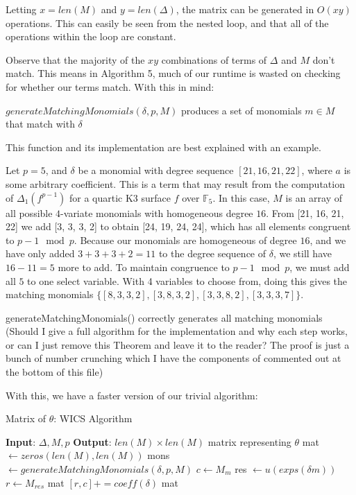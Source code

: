 Letting $x = len(M)$ and $y = len(\Delta)$, the matrix can be generated in $O(xy)$ operations. This can easily be
seen from the nested loop, and that all of the operations within the loop are constant.

Observe that the majority of the $xy$ combinations of terms of $\Delta$ and $M$ don't match. This means in
Algorithm 5, much of our runtime is wasted on checking for whether our terms match. With this in mind:

\begin{defn}
    $generateMatchingMonomials(\delta, p, M)$ produces a set of monomials $m \in M$ that match with $\delta$
\end{defn}

This function and its implementation are best explained with an example.

\begin{ex}
    Let $p = 5$, and $\delta$ be a monomial with degree sequence $[21, 16, 21, 22]$, where $a$ is some arbitrary coefficient. This is a term that may
    result from the computation of $\Delta_1(f^{p - 1})$ for a quartic K3 surface $f$ over $\mathbb{F}_5$. In this case, $M$ is an array
    of all possible $4$-variate monomials with homogeneous degree $16$. From [21, 16, 21, 22] we add [3, 3, 3, 2] to obtain [24, 19, 24, 24], which
    has all elements congruent to $p-1 \mod p$. Because our monomials are homogeneous of degree $16$, and
    we have only added $3 + 3 + 3 + 2 = 11$ to the degree sequence of $\delta$, we still have $16 - 11 = 5$ more to add.
    To maintain congruence to $p-1 \mod p$, we must add all $5$ to one select variable. With 4 variables to choose from, doing this gives the
    matching monomials $\{[8, 3, 3, 2], [3, 8, 3, 2], [3, 3, 8, 2], [3, 3, 3, 7]\}$.
\end{ex}

\begin{thm}
    generateMatchingMonomials() correctly generates all matching monomials (Should I give a full algorithm for the implementation and why each step works, or can I just remove this Theorem and leave it to the reader? The proof is just a bunch of number crunching which I have the components of commented out at the bottom of this file)
\end{thm}

With this, we have a faster version of our trivial algorithm:

\begin{algorithm}[H]
    \caption{Matrix of $\theta$: WICS Algorithm}
    \label{alg:matrix:WICS}
    \begin{algorithmic}[1]
    \State \textbf{Input}: $\Delta, M, p$
    \State \textbf{Output}: $len(M) \times len(M)$ matrix representing $\theta$
    \State mat $\gets zeros(len(M), len(M))$
    \For{$\delta \in \Delta$}
        \State mons $\gets generateMatchingMonomials(\delta, p, M)$
            \State $c \gets M_m$
            \State res $\gets u(exps(\delta m))$
            \State $r \gets M_{res}$
            \State mat $[r, c] += coeff(\delta)$
        \EndFor
    \EndFor
    \State \Return mat
    \end{algorithmic}
\end{algorithm}

